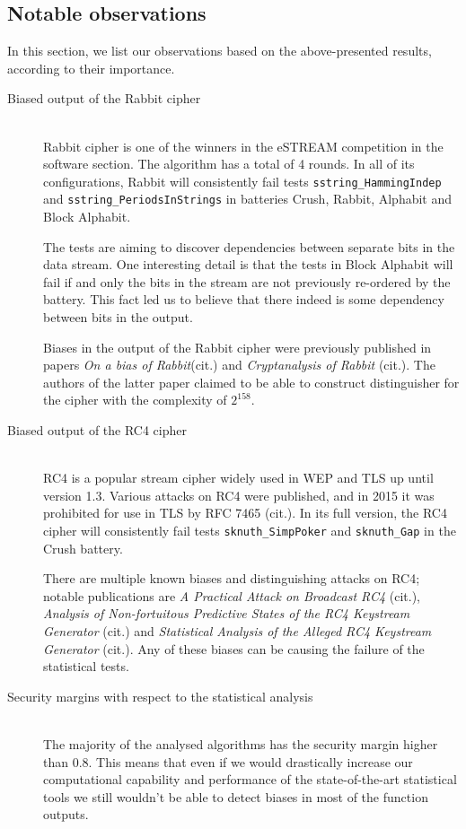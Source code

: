 \documentclass[
  digital,  	%
  color,		%
  oneside,   	%
  12pt,
  nocover,
  notable,
  nolof,
  nolot,
]{fithesis3}
\theoremstyle{definition}
\theoremstyle{remark}
\begin{document}
\subsection{Notable observations}
\label{sec:notable_results}
In this section, we list our observations based on the above-presented results, according to their importance.

\begin{description}
\item[Biased output of the Rabbit cipher] \hfill \\
Rabbit cipher is one of the winners in the eSTREAM competition in the software section. The algorithm has a total of 4 rounds. In all of its configurations, Rabbit will consistently fail tests \texttt{sstring\_HammingIndep} and \texttt{sstring\_PeriodsInStrings} in batteries Crush, Rabbit, Alphabit and Block Alphabit. 

The tests are aiming to discover dependencies between separate bits in the data stream. One interesting detail is that the tests in Block Alphabit will fail if and only the bits in the stream are not previously re-ordered by the battery. This fact led us to believe that there indeed is some dependency between bits in the output.

Biases in the output of the Rabbit cipher were previously published in papers \textit{On a bias of Rabbit}(cit.) and \textit{Cryptanalysis of Rabbit} (cit.). The authors of the latter paper claimed to be able to construct distinguisher for the cipher with the complexity of $2^{158}$.

\item[Biased output of the RC4 cipher] \hfill \\
RC4 is a popular stream cipher widely used in WEP and TLS up until version 1.3. Various attacks on RC4 were published, and in 2015 it was prohibited for use in TLS by RFC 7465 (cit.). In its full version, the RC4 cipher will consistently fail tests \texttt{sknuth\_SimpPoker} and \texttt{sknuth\_Gap} in the Crush battery.

There are multiple known biases and distinguishing attacks on RC4; notable publications are \textit{A Practical Attack on Broadcast RC4} (cit.), \textit{Analysis of Non-fortuitous Predictive States of the RC4 Keystream Generator} (cit.) and \textit{Statistical Analysis of the Alleged RC4 Keystream Generator} (cit.). Any of these biases can be causing the failure of the statistical tests.

\item[Security margins with respect to the statistical analysis] \hfill \\
The majority of the analysed algorithms has the security margin higher than 0.8. This means that even if we would drastically increase our computational capability and performance of the state-of-the-art statistical tools we still wouldn't be able to detect biases in most of the function outputs. 


\end{description}
\end{document}
